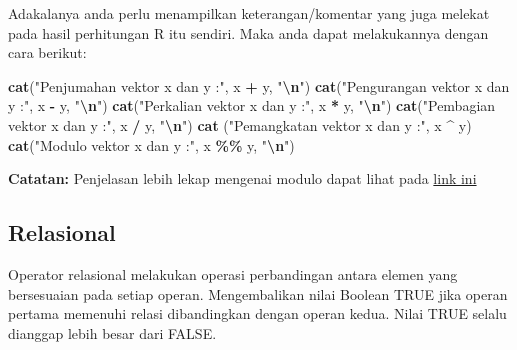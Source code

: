 \documentclass[
]{book}
\newenvironment{Shaded}{\begin{snugshade}}{\end{snugshade}}
\newcommand{\FunctionTok}[1]{\textcolor[rgb]{0.13,0.29,0.53}{\textbf{#1}}}
\newcommand{\NormalTok}[1]{#1}
\newcommand{\SpecialCharTok}[1]{\textcolor[rgb]{0.81,0.36,0.00}{\textbf{#1}}}
\newcommand{\StringTok}[1]{\textcolor[rgb]{0.31,0.60,0.02}{#1}}
\begin{document}
Adakalanya anda perlu menampilkan keterangan/komentar yang juga melekat pada hasil perhitungan R itu sendiri. Maka anda dapat melakukannya dengan cara berikut:

\begin{Shaded}
\begin{Highlighting}[]
\FunctionTok{cat}\NormalTok{(}\StringTok{"Penjumahan vektor x dan y :"}\NormalTok{, x }\SpecialCharTok{+}\NormalTok{ y, }\StringTok{"}\SpecialCharTok{\textbackslash{}n}\StringTok{"}\NormalTok{)}
\FunctionTok{cat}\NormalTok{(}\StringTok{"Pengurangan vektor x dan y :"}\NormalTok{, x }\SpecialCharTok{{-}}\NormalTok{ y, }\StringTok{"}\SpecialCharTok{\textbackslash{}n}\StringTok{"}\NormalTok{)}
\FunctionTok{cat}\NormalTok{(}\StringTok{"Perkalian vektor x dan y :"}\NormalTok{, x }\SpecialCharTok{*}\NormalTok{ y, }\StringTok{"}\SpecialCharTok{\textbackslash{}n}\StringTok{"}\NormalTok{)}
\FunctionTok{cat}\NormalTok{(}\StringTok{"Pembagian vektor x dan y :"}\NormalTok{, x }\SpecialCharTok{/}\NormalTok{ y, }\StringTok{"}\SpecialCharTok{\textbackslash{}n}\StringTok{"}\NormalTok{)}
\FunctionTok{cat}\NormalTok{ (}\StringTok{"Pemangkatan vektor x dan y :"}\NormalTok{, x }\SpecialCharTok{\^{}}\NormalTok{ y) }
\FunctionTok{cat}\NormalTok{(}\StringTok{"Modulo vektor x dan y :"}\NormalTok{, x }\SpecialCharTok{\%\%}\NormalTok{ y, }\StringTok{"}\SpecialCharTok{\textbackslash{}n}\StringTok{"}\NormalTok{)}
\end{Highlighting}
\end{Shaded}

\textbf{Catatan:} Penjelasan lebih lekap mengenai modulo dapat lihat pada \href{https://www.omnicalculator.com/math/modulo}{link ini}

\hypertarget{relasional}{%
\subsection{Relasional}\label{relasional}}

Operator relasional melakukan operasi perbandingan antara elemen yang bersesuaian pada setiap operan. Mengembalikan nilai Boolean TRUE jika operan pertama memenuhi relasi dibandingkan dengan operan kedua. Nilai TRUE selalu dianggap lebih besar dari FALSE.
\end{document}
